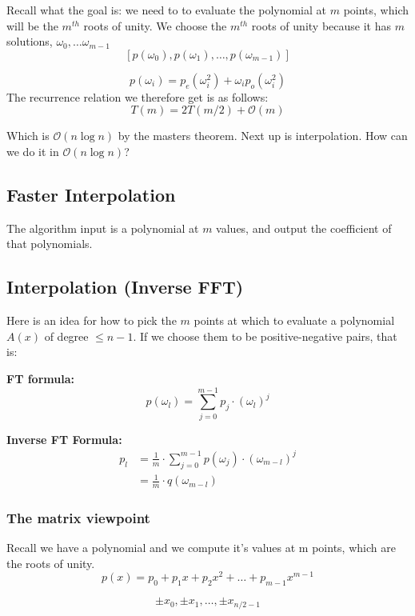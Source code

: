 \documentclass[12pt]{article}
\renewcommand{\O}{\mathcal{O}}
\begin{document}
Recall what the goal is: we need to to evaluate the polynomial at $m$ points, which will be the $m^{th}$ roots of unity. We choose the $m^{th}$ roots of unity because it has $m$ solutions, $\omega_0, \dots \omega_{m - 1}$
$$
    [p(\omega_0), p(\omega_1), \dots, p(\omega_{m - 1})]
$$

$$
    p(\omega_i) = p_e(\omega_i^2) + \omega_i p_o(\omega_i^2)
$$
The recurrence relation we therefore get is as follows:
$$
    T(m) = 2T(m / 2) + \O(m)
$$

Which is $\O(n\log n )$ by the masters theorem. Next up is interpolation. How can we do it in $\O(n\log n)$?
\subsection*{Faster Interpolation}
The algorithm input is a polynomial at $m$ values, and output the coefficient of that polynomials.

\subsection*{Interpolation (Inverse FFT)}
Here is an idea for how to pick the $m$ points at which to evaluate a polynomial $A(x)$ of degree $\le n - 1$. If we choose them to be positive-negative pairs, that is:

\textbf{FT formula:}
$$
    p(\omega_l) = \sum_{j = 0}^{m - 1} p_j \cdot (\omega_l)^j
$$

\textbf{Inverse FT Formula:}
\begin{align*}
    p_l & = \frac{1}{m} \cdot \sum_{j = 0}^{m - 1} p(\omega_j) \cdot (\omega_{m - l})^j \\
        & = \frac{1}{m} \cdot q(\omega_{m - l})
\end{align*}



\subsubsection*{The matrix viewpoint}
Recall we have a polynomial and we compute it's values at m points, which are the roots of unity.
$$
    p(x) = p_0 + p_1 x + p_2 x^2 + \dots + p_{m-1}x^{m - 1}
$$



$$
    \pm x_0, \pm x_1, \dots , \pm x_{n/2 - 1}
$$
\end{document}
